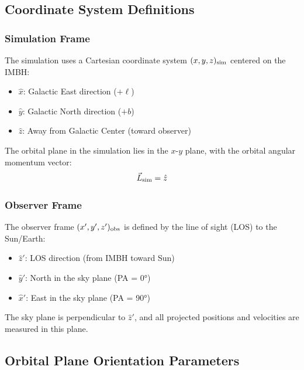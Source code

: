 \documentclass[twocolumn,amsmath,amssymb,prd,superscriptaddress,nofootinbib]{revtex4-2}
\begin{document}
\subsection{Coordinate System Definitions}
\label{sec:coord_systems}

\subsubsection{Simulation Frame}

The simulation uses a Cartesian coordinate system $(x, y, z)_{\rm sim}$ centered on the IMBH:
\begin{itemize}
    \item $\hat{x}$: Galactic East direction ($+\ell$)
    \item $\hat{y}$: Galactic North direction ($+b$)
    \item $\hat{z}$: Away from Galactic Center (toward observer)
\end{itemize}

The orbital plane in the simulation lies in the $x$-$y$ plane, with the orbital angular momentum vector:
\begin{equation}
    \vec{L}_{\rm sim} = \hat{z}
    \label{eq:L_sim}
\end{equation}

\subsubsection{Observer Frame}

The observer frame $(x', y', z')_{\rm obs}$ is defined by the line of sight (LOS) to the Sun/Earth:
\begin{itemize}
    \item $\hat{z}'$: LOS direction (from IMBH toward Sun)
    \item $\hat{y}'$: North in the sky plane (PA = 0°)
    \item $\hat{x}'$: East in the sky plane (PA = 90°)
\end{itemize}

The sky plane is perpendicular to $\hat{z}'$, and all projected positions and velocities are measured in this plane.

\subsection{Orbital Plane Orientation Parameters}
\label{sec:orientation_params}
\end{document}
